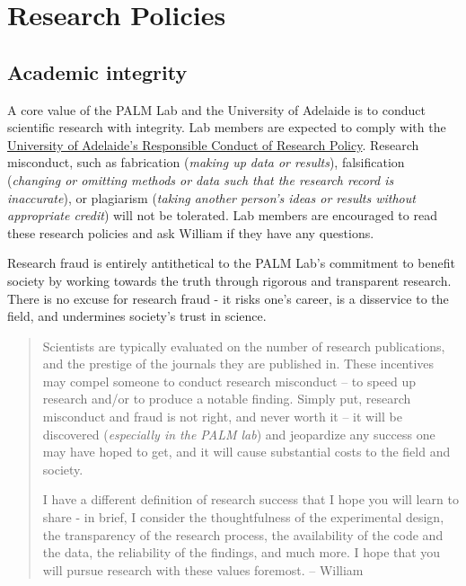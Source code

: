 \documentclass[
]{book}
\theoremstyle{definition}
\theoremstyle{definition}
\theoremstyle{definition}
\theoremstyle{definition}
\theoremstyle{remark}
\begin{document}
\hypertarget{research-policies}{%
\chapter{Research Policies}\label{research-policies}}

\hypertarget{academic-integrity}{%
\section{Academic integrity}\label{academic-integrity}}

A core value of the PALM Lab and the University of Adelaide is to conduct scientific research with integrity. Lab members are expected to comply with the \href{https://www.adelaide.edu.au/policies/96/}{University of Adelaide's Responsible Conduct of Research Policy}. Research misconduct, such as fabrication (\emph{making up data or results}), falsification (\emph{changing or omitting methods or data such that the research record is inaccurate}), or plagiarism (\emph{taking another person's ideas or results without appropriate credit}) will not be tolerated. Lab members are encouraged to read these research policies and ask William if they have any questions.

Research fraud is entirely antithetical to the PALM Lab's commitment to benefit society by working towards the truth through rigorous and transparent research. There is no excuse for research fraud - it risks one's career, is a disservice to the field, and undermines society's trust in science.

\begin{quote}
Scientists are typically evaluated on the number of research publications, and the prestige of the journals they are published in. These incentives may compel someone to conduct research misconduct -- to speed up research and/or to produce a notable finding. Simply put, research misconduct and fraud is not right, and never worth it -- it will be discovered (\emph{especially in the PALM lab}) and jeopardize any success one may have hoped to get, and it will cause substantial costs to the field and society.

I have a different definition of research success that I hope you will learn to share - in brief, I consider the thoughtfulness of the experimental design, the transparency of the research process, the availability of the code and the data, the reliability of the findings, and much more. I hope that you will pursue research with these values foremost. -- William
\end{quote}
\end{document}
